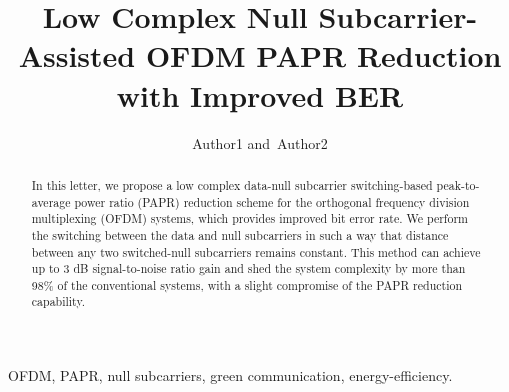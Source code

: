 \documentclass[journal,comsoc]{IEEEtran}
\begin{document}
\title{Low Complex Null Subcarrier-Assisted OFDM PAPR Reduction with Improved BER}
\author{Author1 and~Author2}







\maketitle

\begin{abstract}
In this letter, we propose a low complex data-null subcarrier switching-based peak-to-average power ratio (PAPR) reduction scheme for the orthogonal frequency division multiplexing (OFDM) systems, which provides improved bit error rate. We perform the switching between the data and null subcarriers in such a way that distance between any two switched-null subcarriers remains constant. This method can achieve up to 3 dB signal-to-noise ratio gain and shed the system complexity by more than 98\% of the conventional systems, with a slight compromise of the PAPR reduction capability.
\end{abstract}

\begin{IEEEkeywords}
OFDM, PAPR, null subcarriers, green communication, energy-efficiency.
\end{IEEEkeywords}

\IEEEpeerreviewmaketitle
\end{document}
